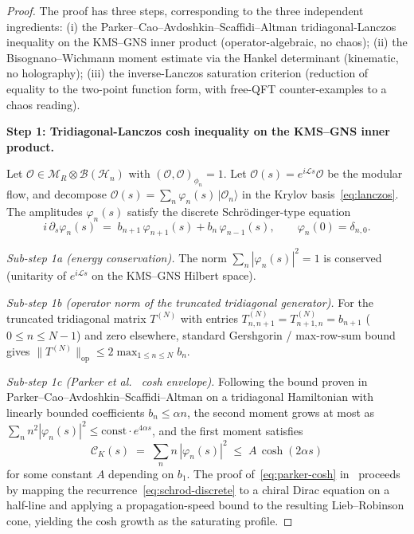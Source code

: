 \documentclass[12pt,a4paper]{article}
\begin{document}
\begin{proof}
The proof has three steps, corresponding to the three independent
ingredients: (i) the Parker--Cao--Avdoshkin--Scaffidi--Altman
tridiagonal-Lanczos inequality on the KMS--GNS inner product
(operator-algebraic, no chaos); (ii) the Bisognano--Wichmann
moment estimate via the Hankel determinant (kinematic, no
holography); (iii) the inverse-Lanczos saturation criterion
(reduction of equality to the two-point function form, with
free-QFT counter-examples to a chaos reading).

\medskip

\noindent\textbf{Step 1: Tridiagonal-Lanczos cosh inequality on the
KMS--GNS inner product.}

Let $\mathcal{O} \in \mathcal{M}_R \otimes \mathcal{B}(\mathcal{H}_n)$
with $(\mathcal{O},\mathcal{O})_{\phi_n} = 1$. Let
$\mathcal{O}(s) = e^{i\mathcal{L}s}\mathcal{O}$ be the modular flow,
and decompose $\mathcal{O}(s) = \sum_n \varphi_n(s)\,|\mathcal{O}_n\rangle$
in the Krylov basis~\eqref{eq:lanczos}. The amplitudes $\varphi_n(s)$
satisfy the discrete Schr\"odinger-type equation
\begin{equation}
  i\,\partial_s \varphi_n(s)
  \;=\;
  b_{n+1}\,\varphi_{n+1}(s) + b_n\,\varphi_{n-1}(s),
  \qquad
  \varphi_n(0) = \delta_{n,0}.
  \label{eq:schrod-discrete}
\end{equation}

\emph{Sub-step 1a (energy conservation).} The norm
$\sum_n |\varphi_n(s)|^2 = 1$ is conserved (unitarity of $e^{i\mathcal{L}s}$
on the KMS--GNS Hilbert space).

\emph{Sub-step 1b (operator norm of the truncated tridiagonal generator).}
For the truncated tridiagonal matrix $T^{(N)}$ with entries
$T^{(N)}_{n,n+1} = T^{(N)}_{n+1,n} = b_{n+1}$ ($0 \le n \le N-1$) and
zero elsewhere, standard Gershgorin / max-row-sum bound gives
$\|T^{(N)}\|_{\mathrm{op}} \le 2 \max_{1\le n\le N} b_n$.

\emph{Sub-step 1c (Parker et al.~\cite{Parker2019} cosh envelope).}
Following the bound proven in Parker--Cao--Avdoshkin--Scaffidi--Altman
\cite[Section II and Appendix on the operator-norm bound]{Parker2019}
on a tridiagonal Hamiltonian with linearly bounded coefficients
$b_n \le \alpha n$, the second moment grows at most as
$\sum_n n^2 |\varphi_n(s)|^2 \le \mathrm{const}\cdot e^{4\alpha s}$,
and the first moment satisfies
\begin{equation}
  \mathcal{C}_K(s) \;=\; \sum_n n\, |\varphi_n(s)|^2
  \;\le\; A\,\cosh(2\alpha s)
  \label{eq:parker-cosh}
\end{equation}
for some constant $A$ depending on $b_1$. The proof of~\eqref{eq:parker-cosh}
in~\cite{Parker2019} proceeds by mapping the recurrence~\eqref{eq:schrod-discrete}
to a chiral Dirac equation on a half-line and applying a propagation-speed
bound to the resulting Lieb--Robinson cone, yielding the cosh growth as
the saturating profile.


\end{proof}
\end{document}
